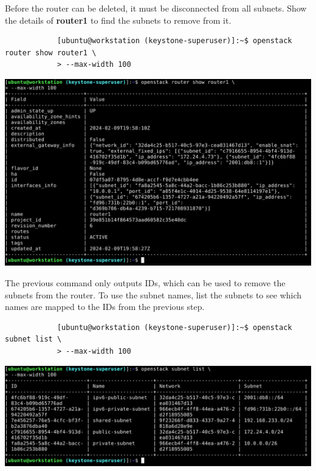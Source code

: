 \documentclass[letterpaper, 12pt]{article}
\begin{document}
\begin{enumerate}
    \begin{labstep}
        Before the router can be deleted, it must be disconnected from all subnets.
        Show the details of \textbf{router1} to find the subnets to remove from it.

        \begin{lstlisting}
            [ubuntu@workstation (keystone-superuser)]:~$ openstack router show router1 \
            > --max-width 100
        \end{lstlisting}

        \begin{center}
            \includegraphics[width=\linewidth]{images/part1/step15.png}
        \end{center}
    \end{labstep}

    \begin{labstep}
        The previous command only outputs IDs, which can be used to remove the subnets from the router.
        To use the subnet names, list the subnets to see which names are mapped to the IDs from the previous step.
        \begin{lstlisting}
            [ubuntu@workstation (keystone-superuser)]:~$ openstack subnet list \
            > --max-width 100
        \end{lstlisting}

        \begin{center}
            \includegraphics[width=\linewidth]{images/part1/step16.png}
        \end{center}
    \end{labstep}


\end{enumerate}
\end{document}
